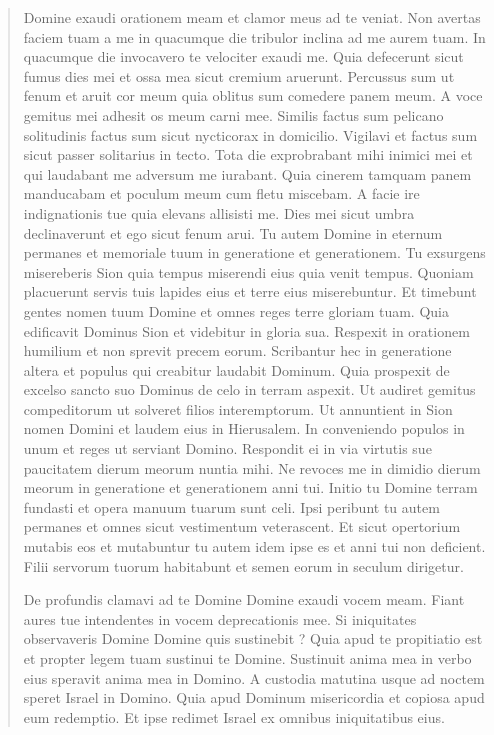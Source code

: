 \documentclass[a4paper,12pt,twoside]{book}
\begin{document}
\begin{quotation}
Domine exaudi orationem meam et clamor meus ad te veniat.
Non avertas faciem tuam a me in quacumque die tribulor inclina ad me aurem tuam.
In quacumque die invocavero te velociter exaudi me.
Quia defecerunt sicut fumus dies mei et ossa mea sicut cremium aruerunt.
Percussus sum ut fenum et aruit cor meum quia oblitus sum comedere panem meum.
A voce gemitus mei adhesit os meum carni mee.
Similis factus sum pelicano solitudinis factus sum sicut nycticorax in domicilio.
Vigilavi et factus sum sicut passer solitarius in tecto.
Tota die exprobrabant mihi inimici mei et qui laudabant me adversum me iurabant.
Quia cinerem tamquam panem manducabam et poculum meum cum fletu miscebam.
A facie ire indignationis tue quia elevans allisisti me.
Dies mei sicut umbra declinaverunt et ego sicut fenum arui.
Tu autem Domine in eternum permanes et memoriale tuum in generatione et generationem.
Tu exsurgens misereberis Sion quia tempus miserendi eius quia venit tempus.
Quoniam placuerunt servis tuis lapides eius et terre eius miserebuntur.
Et timebunt gentes nomen tuum Domine et omnes reges terre gloriam tuam.
Quia edificavit Dominus Sion et videbitur in gloria sua.
Respexit in orationem humilium et non sprevit precem eorum.
Scribantur hec in generatione altera et populus qui creabitur laudabit Dominum.
Quia prospexit de excelso sancto suo Dominus de celo in terram aspexit.
Ut audiret gemitus compeditorum ut solveret filios interemptorum.
Ut annuntient in Sion nomen Domini et laudem eius in Hierusalem.
In conveniendo populos in unum et reges ut serviant Domino.
Respondit ei in via virtutis sue paucitatem dierum meorum nuntia mihi.
Ne revoces me in dimidio dierum meorum in generatione et generationem anni tui.
Initio tu Domine terram fundasti et opera manuum tuarum sunt celi.
Ipsi peribunt tu autem permanes et omnes sicut vestimentum veterascent. 
Et sicut opertorium mutabis eos et mutabuntur 
tu autem idem ipse es et anni tui non deficient.
Filii servorum tuorum habitabunt et semen eorum in seculum dirigetur.

De profundis clamavi ad te Domine Domine exaudi vocem meam. 
Fiant aures tue intendentes in vocem deprecationis mee.
Si iniquitates observaveris Domine Domine quis sustinebit ?
Quia apud te propitiatio est et propter legem tuam sustinui te Domine. 
Sustinuit anima mea in verbo eius speravit anima mea in Domino.
A custodia matutina usque ad noctem speret Israel in Domino.
Quia apud Dominum misericordia et copiosa apud eum redemptio.
Et ipse redimet Israel ex omnibus iniquitatibus eius.


\end{quotation}
\end{document}
